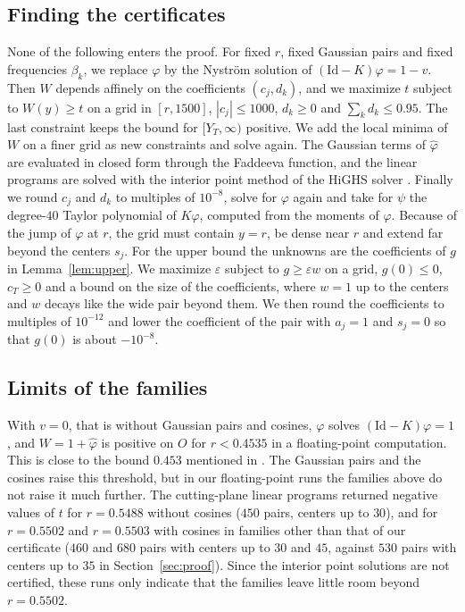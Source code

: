 \documentclass[11pt]{amsart}
\theoremstyle{definition}
\theoremstyle{remark}
\numberwithin{equation}{section}
\newcommand{\Id}{\mathrm{Id}}
\newcommand{\ft}[1]{\widehat{#1}}
\newcommand{\rdec}{0.5502}
\newcommand{\npairsU}{530}
\newcommand{\lpG}{0.5488}
\newcommand{\lpC}{0.5502}
\newcommand{\lpCb}{0.5503}
\newcommand{\vzero}{0.4535}
\begin{document}
\subsection*{Finding the certificates} None of the following enters the proof. For fixed $r$, fixed Gaussian pairs and fixed frequencies $\beta_k$, we replace $\varphi$ by the Nystr\"om solution of $(\Id-K)\varphi=1-v$. Then $W$ depends affinely on the coefficients $(c_j,d_k)$, and we maximize $t$ subject to $W(y)\ge t$ on a grid in $[r,1500]$, $|c_j|\le1000$, $d_k\ge0$ and $\sum_kd_k\le0.95$. The last constraint keeps the bound for $[Y_T,\infty)$ positive. We add the local minima of $W$ on a finer grid as new constraints and solve again. The Gaussian terms of $\ft\varphi$ are evaluated in closed form through the Faddeeva function, and the linear programs are solved with the interior point method \cite{SG20} of the HiGHS solver \cite{HH18}. Finally we round $c_j$ and $d_k$ to multiples of $10^{-8}$, solve for $\varphi$ again and take for $\psi$ the degree-$40$ Taylor polynomial of $K\varphi$, computed from the moments of $\varphi$. Because of the jump of $\varphi$ at $r$, the grid must contain $y=r$, be dense near $r$ and extend far beyond the centers $s_j$. For the upper bound the unknowns are the coefficients of $g$ in Lemma~\ref{lem:upper}. We maximize $\varepsilon$ subject to $g\ge\varepsilon w$ on a grid, $g(0)\le0$, $c_T\ge0$ and a bound on the size of the coefficients, where $w=1$ up to the centers and $w$ decays like the wide pair beyond them. We then round the coefficients to multiples of $10^{-12}$ and lower the coefficient of the pair with $a_j=1$ and $s_j=0$ so that $g(0)$ is about $-10^{-8}$.

\subsection*{Limits of the families} With $v=0$, that is without Gaussian pairs and cosines, $\varphi$ solves $(\Id-K)\varphi=1$, and $W=1+\ft\varphi$ is positive on $O$ for $r<\vzero$ in a floating-point computation. This is close to the bound $0.453$ mentioned in \cite[Section~4]{GOS17}. The Gaussian pairs and the cosines raise this threshold, but in our floating-point runs the families above do not raise it much further. The cutting-plane linear programs returned negative values of $t$ for $r=\lpG$ without cosines ($450$ pairs, centers up to $30$), and for $r=\lpC$ and $r=\lpCb$ with cosines in families other than that of our certificate ($460$ and $680$ pairs with centers up to $30$ and $45$, against $\npairsU$ pairs with centers up to $35$ in Section~\ref{sec:proof}). Since the interior point solutions are not certified, these runs only indicate that the families leave little room beyond $r=\rdec$.
\end{document}
